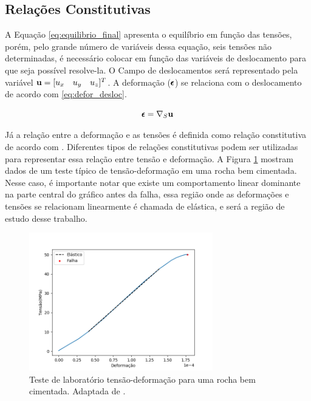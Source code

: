 \subsection{Relações Constitutivas}

A Equação \eqref{eq:equilibrio_final} apresenta o equilíbrio em função das tensões, porém, pelo grande número de variáveis dessa equação, seis tensões não determinadas, é necessário colocar em função das variáveis de deslocamento para que seja possível resolve-la. O Campo de deslocamentos será representado pela variável $\mathbf{u} = [u_x \quad u_y \quad u_z]^T$. A deformação ($\pmb{\epsilon}$) se relaciona com o deslocamento de acordo com \eqref{eq:defor_desloc}. 

\begin{equation}
\label{eq:defor_desloc}
\pmb{\epsilon} = \nabla_S \mathbf{u}
\end{equation}


Já a relação entre a deformação e as tensões é definida como relação constitutiva de acordo com \citet{ResGeomec}. Diferentes tipos de relações constitutivas podem ser utilizadas para representar essa relação entre tensão e deformação. A Figura \ref{fig:stress_strain} mostram dados de um teste típico de tensão-deformação em uma rocha bem cimentada. Nesse caso, é importante notar que existe um comportamento linear dominante na parte central do gráfico antes da falha, essa região onde as deformações e tensões se relacionam linearmente é chamada de elástica, e será a região de estudo desse trabalho. %


\begin{figure}[!htbp]
\centering
\includegraphics[width=8cm]{chap01/figs/stress_strain.png}
\caption{Teste de laboratório tensão-deformação para uma rocha bem cimentada. Adaptada de \citet{ResGeomec}.}
\label{fig:stress_strain}
\end{figure}


